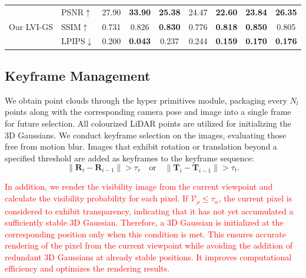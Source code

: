 \documentclass[lettersize,journal]{IEEEtran}
\begin{document}
\begin{table}[htp]
\begin{tabular}{@{}llccccccc@{}}
        \midrule
        \multirow{3}{*}{Our LVI-GS} & PSNR$\uparrow$ & 27.90 & \textbf{33.90} & \textbf{25.38} & 24.47 & \textbf{22.60} & \textbf{23.84} & \textbf{26.35} \\
        & SSIM$\uparrow$ & 0.731 & 0.826 & \textbf{0.830} & 0.776 & \textbf{0.818} & \textbf{0.850} & 0.805 \\
        & LPIPS$\downarrow$ & 0.200 & \textbf{0.043} & 0.237 & 0.244 & \textbf{0.159} & \textbf{0.170} & \textbf{0.176} \\
        \bottomrule
    \end{tabular}
    \captionsetup{justification=centering, labelsep=colon} %
\end{table}

\subsection{Keyframe Management}

We obtain point clouds through the hyper primitives module, packaging every $N_l$ points along with the corresponding camera pose and image into a single frame for future selection. All colourized LiDAR points are utilized for initializing the 3D Gaussians. We conduct keyframe selection on the images, evaluating those free from motion blur. Images that exhibit rotation or translation beyond a specified threshold are added as keyframes to the keyframe sequence:
\begin{equation}
\left\lVert \mathbf{R}_i - \mathbf{R}_{i-1} \right\rVert > \tau_r \quad \text{or} \quad \left\lVert \mathbf{T}_i - \mathbf{T}_{i-1} \right\rVert > \tau_t.
\label{eq:threshold}
\end{equation}

\textcolor{red}{In addition, we render the visibility image from the current viewpoint and calculate the visibility probability for each pixel. If $\mathcal{V}_{\rho} \leq \tau_{\alpha}$, the current pixel is considered to exhibit transparency, indicating that it has not yet accumulated a sufficiently stable 3D Gaussian. Therefore, a 3D Gaussian is initialized at the corresponding position only when this condition is met. This ensures accurate rendering of the pixel from the current viewpoint while avoiding the addition of redundant 3D Gaussians at already stable positions. It improves computational efficiency and optimizes the rendering results.}
\end{document}
